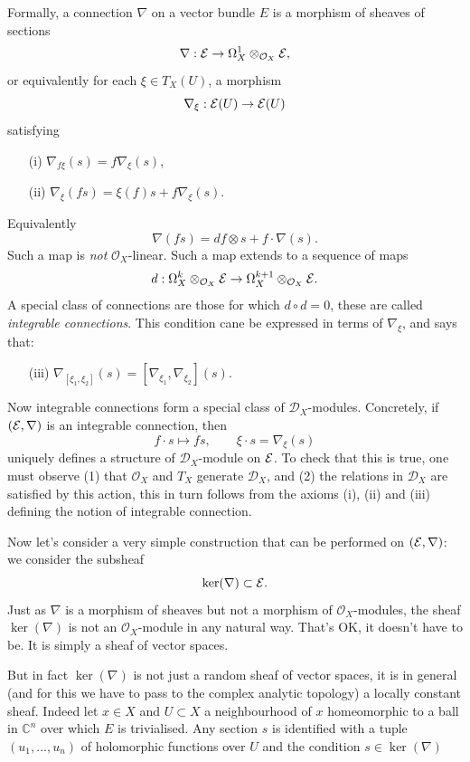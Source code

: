 \documentclass[12pt]{article}
\theoremstyle{plain}
\theoremstyle{definition}
\numberwithin{equation}{section}
\newcommand{\C}{\mathbb{C}}
\newcommand{\CD}{\mathcal{D}}
\newcommand{\OO}{\mathcal{O}}
\begin{document}
Formally, a connection $\nabla$ on a vector bundle $E$ is a morphism of sheaves of sections
\[
\nabla : \E \rightarrow \Omega^1_X \otimes_{\OO_X} \E,
\]
or equivalently for each $\xi \in T_X(U)$, a morphism
\[
\nabla_\xi : \mathcal{E}(U) \rightarrow \mathcal{E}(U)
\]
satisfying
\begin{itemize}
\item[(i)] $\nabla_{f\xi}(s) = f \nabla_\xi(s)$,

\item[(ii)] $\nabla_\xi(fs) = \xi(f) s + f \nabla_\xi(s)$.
\end{itemize}
Equivalently
\[
\nabla(fs) = df \otimes s + f \cdot \nabla(s).
\]
Such a map is \emph{not} $\OO_X$-linear. Such a map extends to a sequence of maps
\[
d : \Omega^k_X \otimes_{\OO_X} \E \rightarrow \Omega^{k+1}_X \otimes_{\OO_X} \E.
\]
A special class of connections are those for which $d \circ d = 0$, these are called \emph{integrable connections}. This condition cane be expressed in terms of $\nabla_\xi$, and says that:
\begin{itemize}
\item[(iii)] $\nabla_{[\xi_1, \xi_2]}(s) = [\nabla_{\xi_1}, \nabla_{\xi_2}](s)$.
\end{itemize}


Now integrable connections form a special class of $\CD_X$-modules. Concretely, if $(\mathcal{E}, \nabla)$ is an integrable connection, then
\[
f \cdot s \mapsto f s, \qquad \xi \cdot s = \nabla_\xi(s)
\]
uniquely defines a structure of $\CD_X$-module on $\mathcal{E}$. To check that this is true, one must observe (1) that $\OO_X$ and $T_X$ generate $\CD_X$, and (2) the relations in $\CD_X$ are satisfied by this action, this in turn follows from the axioms (i), (ii) and (iii) defining the notion of integrable connection.


Now let's consider a very simple construction that can be performed on $(\mathcal{E}, \nabla)$: we consider the subsheaf
\[
\ker(\nabla) \subset \mathcal{E}.
\]
Just as $\nabla$ is a morphism of sheaves but not a morphism of $\OO_X$-modules, the sheaf $\ker(\nabla)$ is not an $\OO_X$-module in any natural way. That's OK, it doesn't have to be. It is simply a sheaf of vector spaces.

But in fact $\ker(\nabla)$ is not just a random sheaf of vector spaces, it is in general (and for this we have to pass to the complex analytic topology) a locally constant sheaf. Indeed let $x \in X$ and $U \subset X$ a neighbourhood of $x$ homeomorphic to a ball in $\C^n$ over which $E$ is trivialised. Any section $s$ is identified with a tuple $(u_1, \ldots, u_n)$ of holomorphic functions over $U$ and the condition $s \in \ker(\nabla)$
\end{document}
